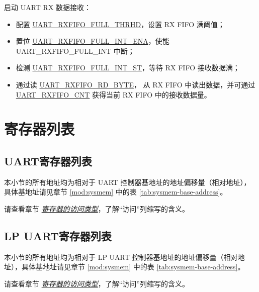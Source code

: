 \documentclass[main\_\_CN.tex]{subfiles}
\begin{document}
启动 UART RX 数据接收：
\begin{itemize}
    \item 配置 \hyperref[fielddesc:UARTRXFIFOFULLTHRHD]{UART\_RXFIFO\_FULL\_THRHD}，设置 RX FIFO 满阈值；
    \item 置位 \hyperref[fielddesc:UARTRXFIFOFULLINTENA]{UART\_RXFIFO\_FULL\_INT\_ENA}，使能 UART\_RXFIFO\_FULL\_INT 中断；
    \item 检测 \hyperref[fielddesc:UARTRXFIFOFULLINTST]{UART\_RXFIFO\_FULL\_INT\_ST}，等待 RX FIFO 接收数据满；
    \item 通过读 \hyperref[fielddesc:UARTRXFIFORDBYTE]{UART\_RXFIFO\_RD\_BYTE}， 从 RX FIFO 中读出数据，并可通过 \hyperref[fielddesc:UARTRXFIFOCNT]{UART\_RXFIFO\_CNT} 获得当前 RX FIFO 中的接收数据量。
\end{itemize}



\clearpage
\section{寄存器列表}
\label{sec:uart-reg-summ}
\hypertarget{uart-reg-summ}{}

\subsection{UART寄存器列表}

本小节的所有地址均为相对于 UART 控制器基地址的地址偏移量（相对地址），具体基地址请见章节 \ref{mod:sysmem} \textit{} 中的表 \ref{tab:sysmem-base-address}。

请查看章节 \hyperref[glossary-access-types]{\textit{寄存器的访问类型}}，了解“访问”列缩写的含义。



\subsection{LP UART寄存器列表}

本小节的所有地址均为相对于 LP UART 控制器基地址的地址偏移量（相对地址），具体基地址请见章节 \ref{mod:sysmem} \textit{} 中的表 \ref{tab:sysmem-base-address}。

请查看章节 \hyperref[glossary-access-types]{\textit{寄存器的访问类型}}，了解“访问”列缩写的含义。


\end{document}
